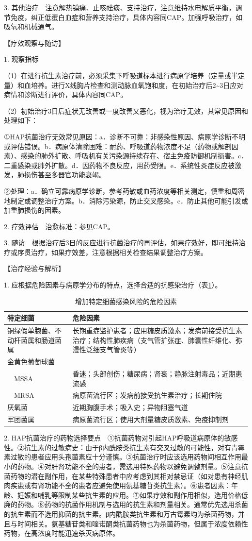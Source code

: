 3.
其他治疗　注意解热镇痛、止咳祛痰、支持治疗，注意维持水电解质平衡，调节免疫，纠正低蛋白血症和营养支持治疗，具体内容同CAP。加强呼吸治疗，如吸氧和机械通气。

【疗效观察与随访】

1. 观察指标

（1）在进行抗生素治疗前，必须采集下呼吸道标本进行病原学培养（定量或半定量）和血培养。进行X线胸片检查和测动脉血氧饱和度，在初始治疗后2\textasciitilde{}3日应对病情和诊断进行评价，具体内容同CAP。

（2）初始治疗3日后症状无改善或一度改善又恶化，视为治疗无效，其常见原因和处理如下：

①HAP抗菌治疗无效常见原因：a．诊断不可靠：非感染性原因、病原学诊断不明或评估错误。b．病原体清除困难：耐药、呼吸道药物浓度不足（药物或解剖因素）、感染的肺外扩散、呼吸机有关污染源持续存在、宿主免疫防御机制损害。c．二重感染或肺外扩散。d．因药物不良反应，用药受限。e．系统性炎症反应被激发，肺损伤甚至多器官功能衰竭。

②处理：a．确立可靠病原学诊断，参考药敏或血药浓度等相关测定，慎重和周密地制定或调整治疗方案。b．消除污染源，防止交叉感染。c．防止其他可能引发或加重肺损伤的因素。

2. 疗效评估　治愈标准：参见CAP。

3.
随访　根据治疗后3日的反应进行抗菌治疗的再评估，如果疗效好，即可维持治疗或序贯治疗，如果疗效差，注意根据相关检查结果调整治疗方案。

【治疗经验与解析】

1. 应根据危险因素与病原学分布的特点，选择合适的抗感染治疗（表\ref{tab1-8-5}）。

\begin{longtable}[]{lp{8cm}}
  \caption{增加特定细菌感染风险的危险因素}
  \label{tab1-8-5}\\
\toprule
特定细菌 & 危险因素\tabularnewline
\midrule
\endhead
铜绿假单胞菌、不动杆菌属和肠道菌属 &
长期重症监护患者；应用糖皮质激素；发病前接受抗生素治疗；结构性肺疾病（支气管扩张症、肺囊性纤维化、弥漫性泛细支气管炎等）\tabularnewline
金黄色葡萄球菌 &\tabularnewline
　MSSA &
昏迷；头部创伤；糖尿病；肾衰；静脉注射毒品；近期患流感\tabularnewline
　MRSA & 病原菌流行区；发病前接受抗生素治疗；长期住院\tabularnewline
厌氧菌 & 近期胸腹手术；吸入史；异物阻塞气道\tabularnewline
军团菌属 & 病原菌流行区；使用大剂量糖皮质激素、免疫抑制剂\tabularnewline
\bottomrule
\end{longtable}

2.
HAP抗菌治疗的药物选择要点　①抗菌药物对引起HAP呼吸道病原体的敏感性。②抗生素的过敏病史：由于β内酰胺类抗生素有交叉过敏的可能性，对有青霉素过敏的患者应用头孢菌素应十分谨慎。③抗菌治疗时应该选用药物间相互作用最小的药物。④对肝肾功能不全的患者，需选用特殊药物以避免调整剂量。⑤注意抗菌药物的潜在副作用，在某些特殊患者中应考虑到其相对禁忌证（如对患有神经肌肉疾患或有肾功能不全的患者应避免使用氨基糖苷类抗生素）。⑥患者因素：年龄、妊娠和哺乳等限制某些抗生素的应用。⑦如果疗效和副作用相似，选用价格低廉的药物。⑧药物的抗菌作用机制与选用的抗生素和剂量相关。通常优先选用杀菌的抗生素而不选用抑菌的抗生素。β内酰胺类抗生素和万古霉素均为杀菌药物，并且与时间相关。氨基糖苷类和喹诺酮类抗菌药物也为杀菌药物，但属于浓度依赖性药物，在高浓度时能迅速杀灭病原体。

